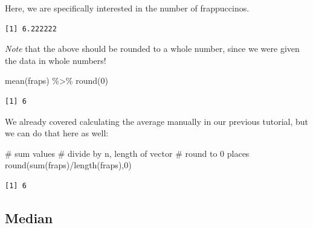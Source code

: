 \documentclass[
  letterpaper,
  DIV=11,
  numbers=noendperiod]{scrreprt}
\newenvironment{Shaded}{\begin{snugshade}}{\end{snugshade}}
\newcommand{\CommentTok}[1]{\textcolor[rgb]{0.37,0.37,0.37}{#1}}
\newcommand{\DecValTok}[1]{\textcolor[rgb]{0.68,0.00,0.00}{#1}}
\newcommand{\FunctionTok}[1]{\textcolor[rgb]{0.28,0.35,0.67}{#1}}
\newcommand{\NormalTok}[1]{\textcolor[rgb]{0.00,0.23,0.31}{#1}}
\newcommand{\OtherTok}[1]{\textcolor[rgb]{0.00,0.23,0.31}{#1}}
\newcommand{\SpecialCharTok}[1]{\textcolor[rgb]{0.37,0.37,0.37}{#1}}
\begin{document}
Here, we are specifically interested in the number of frappuccinos.

\begin{Shaded}
\end{Shaded}

\begin{verbatim}
[1] 6.222222
\end{verbatim}

\emph{Note} that the above should be rounded to a whole number, since we
were given the data in whole numbers!

\begin{Shaded}
\begin{Highlighting}[]
\FunctionTok{mean}\NormalTok{(fraps) }\SpecialCharTok{\%\textgreater{}\%}
  \FunctionTok{round}\NormalTok{(}\DecValTok{0}\NormalTok{)}
\end{Highlighting}
\end{Shaded}

\begin{verbatim}
[1] 6
\end{verbatim}

We already covered calculating the average manually in our previous
tutorial, but we can do that here as well:

\begin{Shaded}
\begin{Highlighting}[]
\CommentTok{\# sum values}
\CommentTok{\# divide by n, length of vector}
\CommentTok{\# round to 0 places}
\FunctionTok{round}\NormalTok{(}\FunctionTok{sum}\NormalTok{(fraps)}\SpecialCharTok{/}\FunctionTok{length}\NormalTok{(fraps),}\DecValTok{0}\NormalTok{)}
\end{Highlighting}
\end{Shaded}

\begin{verbatim}
[1] 6
\end{verbatim}

\subsection{Median}\label{median}
\end{document}
